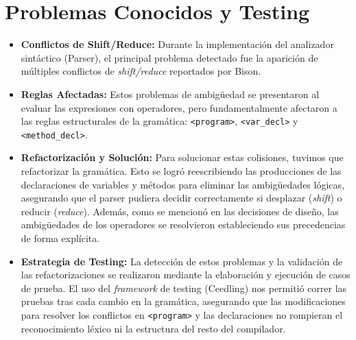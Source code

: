 \documentclass[11pt, a4paper]{article}
\begin{document}
\section{Problemas Conocidos y Testing}

\begin{itemize}
    \item \textbf{Conflictos de Shift/Reduce:} Durante la implementación del analizador sintáctico (Parser), el principal problema detectado fue la aparición de múltiples conflictos de \textit{shift/reduce} reportados por Bison.
    
    \item \textbf{Reglas Afectadas:} Estos problemas de ambigüedad se presentaron al evaluar las expresiones con operadores, pero fundamentalmente afectaron a las reglas estructurales de la gramática: \texttt{<program>}, \texttt{<var\_decl>} y \texttt{<method\_decl>}.
    
    \item \textbf{Refactorización y Solución:} Para solucionar estas colisiones, tuvimos que refactorizar la gramática. Esto se logró reescribiendo las producciones de las declaraciones de variables y métodos para eliminar las ambigüedades lógicas, asegurando que el parser pudiera decidir correctamente si desplazar (\textit{shift}) o reducir (\textit{reduce}). Además, como se mencionó en las decisiones de diseño, las ambigüedades de los operadores se resolvieron estableciendo sus precedencias de forma explícita.
    
    \item \textbf{Estrategia de Testing:} La detección de estos problemas y la validación de las refactorizaciones se realizaron mediante la elaboración y ejecución de casos de prueba. El uso del \textit{framework} de testing (Ceedling) nos permitió correr las pruebas tras cada cambio en la gramática, asegurando que las modificaciones para resolver los conflictos en \texttt{<program>} y las declaraciones no rompieran el reconocimiento léxico ni la estructura del resto del compilador.
\end{itemize}
\end{document}
